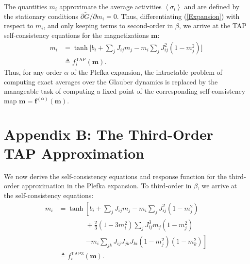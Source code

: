 \documentclass[letterpaper]{article} %
\begin{document}
The quantities $m_i$ approximate the average activities $\left<\sigma_i\right>$ and are defined by the stationary conditions $\partial \tilde{G}/\partial m_i=0$. Thus, differentiating (\ref{Expansion}) with respect to $m_i$, and only keeping terms to second-order in $\beta$, we arrive at the TAP self-consistency equations for the magnetizations $\bm{m}$:
\begin{align}
\label{TAP}
m_i &= \tanh\Big[b_i + \sum_j J_{ij}m_j - m_i\sum_j J_{ij}^2(1-m_j^2) \Big] \nonumber \\
&\triangleq f^{\text{TAP}}_i(\bm{m}).
\end{align}
Thus, for any order $\alpha$ of the Plefka expansion, the intractable problem of computing exact averages over the Glauber dynamics is replaced by the manageable task of computing a fixed point of the corresponding self-consistency map $\bm{m} = \bm{f}^{(\alpha)}(\bm{m})$.

\section{Appendix B: The Third-Order TAP Approximation}

We now derive the self-consistency equations and response function for the third-order approximation in the Plefka expansion. To third-order in $\beta$, we arrive at the self-consistency equations:
\begin{align}
\label{SC}
m_i &= \tanh\left[b_i + \sum_j J_{ij} m_j - m_i\sum_j J_{ij}^2(1-m_j^2) \right. \nonumber \\
&\quad \quad\quad\quad + \frac{2}{3}(1-3m_i^2)\sum_j J_{ij}^3 m_j(1-m_j^2) \nonumber \\
& \quad\quad\quad\quad \left. - m_i\sum_{jk} J_{ij}J_{jk} J_{ki} (1-m_j^2)(1-m_k^2)\right] \nonumber \\
&\triangleq f^{\text{TAP3}}_i(\bm{m}).
\end{align}
\end{document}
